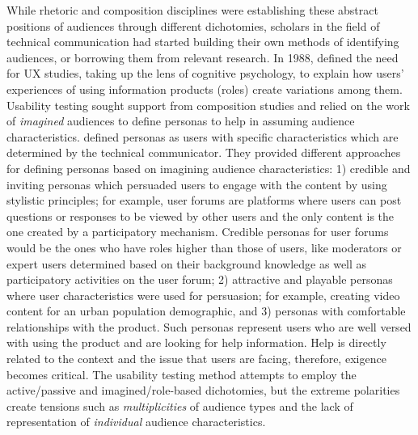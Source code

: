 While rhetoric and composition disciplines were establishing these abstract positions of audiences through different dichotomies, scholars in the field of technical communication had started building their own methods of identifying audiences, or borrowing them from relevant research. In 1988, \textcite{norman1988psychology} defined the need for UX studies, taking up the lens of cognitive psychology, to explain how users' experiences of using information products (roles) create variations among them. Usability testing sought support from composition studies and relied on the work of \textit{imagined} audiences \cite{ong1975writer} to define personas to help in assuming audience characteristics. \textcite{coney2000role} defined personas as users with specific characteristics which are determined by the technical communicator. They provided different approaches for defining personas based on imagining audience characteristics: 1) credible and inviting personas which persuaded users to engage with the content by using stylistic principles; for example, user forums are platforms where users can post questions or responses to be viewed by other users and the only content is the one created by a participatory mechanism. Credible personas for user forums would be the ones who have roles higher than those of users, like moderators or expert users determined based on their background knowledge as well as participatory activities on the user forum; 2) attractive and playable personas where user characteristics were used for persuasion; for example, creating video content for an urban population demographic, and 3) personas with comfortable relationships with the product. Such personas represent users who are well versed with using the product and are looking for help information. Help is directly related to the context and the issue that users are facing, therefore, exigence becomes critical. The usability testing method attempts to employ the active/passive and imagined/role-based dichotomies, but the extreme polarities create tensions such as \textit{multiplicities} of audience types and the lack of representation of \textit{individual} audience characteristics.

